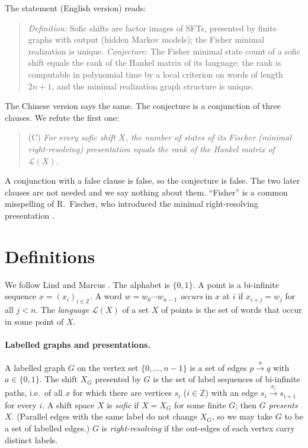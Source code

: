 \documentclass[11pt]{article}
\theoremstyle{definition}
\theoremstyle{remark}
\newcommand{\Lang}{\mathcal{L}}
\begin{document}
The statement (English version) reads:
\begin{quote}
\emph{Definition:} Sofic shifts are factor images of SFTs, presented by
finite graphs with output (hidden Markov models); the Fisher minimal
realization is unique. \emph{Conjecture:} The Fisher minimal state count of
a sofic shift equals the rank of the Hankel matrix of its language; the rank
is computable in polynomial time by a local criterion on words of length
$2n+1$, and the minimal realization graph structure is unique.
\end{quote}
The Chinese version says the same. The conjecture is a conjunction of three
clauses. We refute the first one:
\begin{quote}
(C) \emph{For every sofic shift $X$, the number of states of its Fischer
(minimal right-resolving) presentation equals the rank of the Hankel matrix
of $\Lang(X)$.}
\end{quote}
A conjunction with a false clause is false, so the conjecture is false. The
two later clauses are not needed and we say nothing about them. ``Fisher'' is
a common misspelling of R.~Fischer, who introduced the minimal
right-resolving presentation \cite{fischer}.

\section{Definitions}

We follow Lind and Marcus \cite{lm}. The alphabet is $\{0,1\}$. A point is a
bi-infinite sequence $x=(x_i)_{i\in\mathbb Z}$. A word $w=w_0\cdots w_{n-1}$
\emph{occurs} in $x$ at $i$ if $x_{i+j}=w_j$ for all $j<n$. The
\emph{language} $\Lang(X)$ of a set $X$ of points is the set of words that
occur in some point of $X$.

\paragraph{Labelled graphs and presentations.} A labelled graph $G$ on the
vertex set $\{0,\dots,n-1\}$ is a set of edges $p\xrightarrow{a}q$ with
$a\in\{0,1\}$. The shift $X_G$ presented by $G$ is the set of label sequences
of bi-infinite paths, i.e.\ of all $x$ for which there are vertices $s_i$
($i\in\mathbb Z$) with an edge $s_i\xrightarrow{x_i}s_{i+1}$ for every $i$. A
shift space $X$ is \emph{sofic} if $X=X_G$ for some finite $G$; then $G$
\emph{presents} $X$. (Parallel edges with the same label do not change $X_G$,
so we may take $G$ to be a set of labelled edges.) $G$ is
\emph{right-resolving} if the out-edges of each vertex carry distinct labels.
\end{document}
